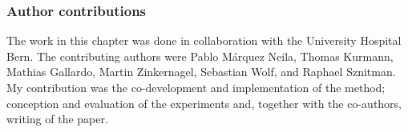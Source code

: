 \subsubsection{Author contributions}The work in this chapter was done in collaboration with the University Hospital Bern. The contributing authors were Pablo Márquez Neila, Thomas Kurmann, Mathias Gallardo, Martin Zinkernagel, Sebastian Wolf, and Raphael Sznitman. My contribution was the co-development and implementation of the method; conception and evaluation of the experiments and, together with the co-authors, writing of the paper.






